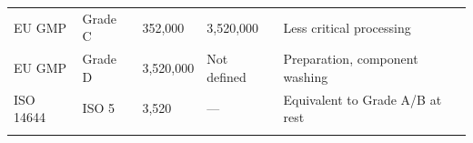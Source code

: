 \documentclass[
  11pt,
  a4paper,
]{report}
\begin{document}
\begin{longtable}[]{@{}lllll@{}}
\begin{minipage}[t]{0.08\columnwidth}\raggedright
EU GMP\strut
\end{minipage} & \begin{minipage}[t]{0.06\columnwidth}\raggedright
Grade C\strut
\end{minipage} & \begin{minipage}[t]{0.29\columnwidth}\raggedright
352,000\strut
\end{minipage} & \begin{minipage}[t]{0.33\columnwidth}\raggedright
3,520,000\strut
\end{minipage} & \begin{minipage}[t]{0.10\columnwidth}\raggedright
Less critical processing\strut
\end{minipage}\tabularnewline
\begin{minipage}[t]{0.08\columnwidth}\raggedright
EU GMP\strut
\end{minipage} & \begin{minipage}[t]{0.06\columnwidth}\raggedright
Grade D\strut
\end{minipage} & \begin{minipage}[t]{0.29\columnwidth}\raggedright
3,520,000\strut
\end{minipage} & \begin{minipage}[t]{0.33\columnwidth}\raggedright
Not defined\strut
\end{minipage} & \begin{minipage}[t]{0.10\columnwidth}\raggedright
Preparation, component washing\strut
\end{minipage}\tabularnewline
\begin{minipage}[t]{0.08\columnwidth}\raggedright
ISO 14644\strut
\end{minipage} & \begin{minipage}[t]{0.06\columnwidth}\raggedright
ISO 5\strut
\end{minipage} & \begin{minipage}[t]{0.29\columnwidth}\raggedright
3,520\strut
\end{minipage} & \begin{minipage}[t]{0.33\columnwidth}\raggedright
---\strut
\end{minipage} & \begin{minipage}[t]{0.10\columnwidth}\raggedright
Equivalent to Grade A/B at rest\strut
\end{minipage}\tabularnewline
\begin{minipage}[t]{0.08\columnwidth}\raggedright

\end{minipage}
\end{longtable}
\end{document}
